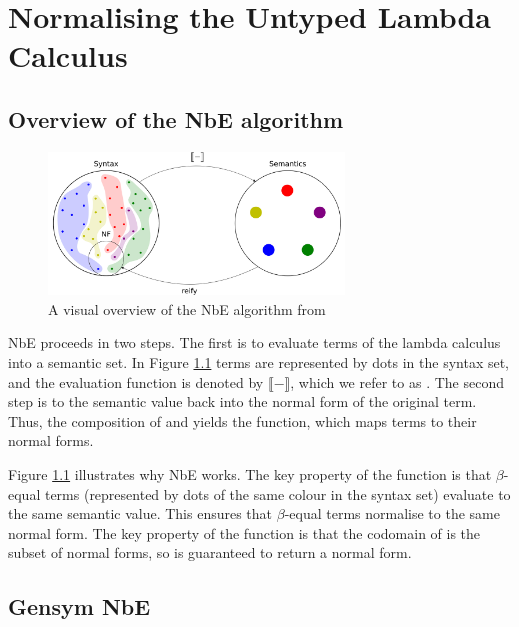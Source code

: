 \chapter{Normalising the Untyped Lambda Calculus}
\label{chap:untypednbe}

\section{Overview of the NbE algorithm}

\begin{figure}[h]
    \centering
    \includegraphics[width=0.7\textwidth]{./images/nbe_diagram}
    \caption{A visual overview of the NbE algorithm from \cite{slides}}
    \label{fig:nbeOverview}
\end{figure}

NbE proceeds in two steps. The first is to evaluate terms of the lambda calculus into a semantic set. In Figure \ref{fig:nbeOverview} terms are represented by dots in the syntax set, and the evaluation function is denoted by $\llbracket - \rrbracket$, which we refer to as . The second step is to  the semantic value back into the normal form of the original term. Thus, the composition of  and  yields the  function, which maps terms to their normal forms. 

Figure \ref{fig:nbeOverview} illustrates why NbE works. The key property of the  function is that $\beta$-equal terms (represented by dots of the same colour in the syntax set) evaluate to the same semantic value. This ensures that $\beta$-equal terms normalise to the same normal form. The key property of the  function is that the codomain of  is the subset of normal forms, so  is guaranteed to return a normal form. 

\section{Gensym NbE}

